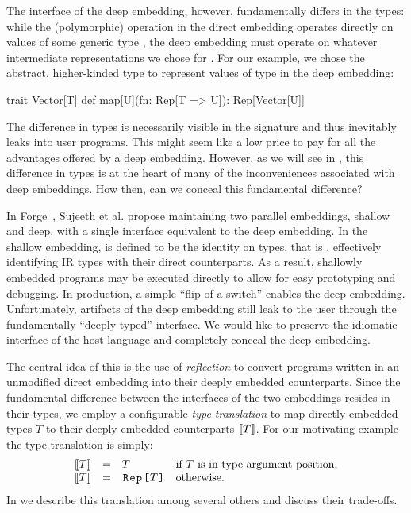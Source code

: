 The interface of the deep embedding, however,
fundamentally differs in the types: while the (polymorphic) 
operation in the direct embedding operates directly on values of some
generic type , the deep embedding must operate on whatever
intermediate representations we chose for . For our example,
we chose the abstract, higher-kinded type  to represent
values of type  in the deep embedding:\begin{lstparagraph}
trait Vector[T] {
  def map[U](fn: Rep[T => U]): Rep[Vector[U]]
}
\end{lstparagraph}

The difference in types is necessarily visible in the
signature and thus inevitably leaks into user programs. This might seem like
a low price to pay for all the advantages offered by a deep embedding.
However, as we will see in , this
difference in types is at the heart of many of the inconveniences
associated with deep embeddings. How then, can we conceal
this fundamental difference?

In Forge~\cite{forge}, Sujeeth et al. propose maintaining two parallel
embeddings, shallow and deep, with a single interface equivalent to
the deep embedding.  In the shallow embedding,  is defined
to be the identity on types, that is , effectively
identifying IR types with their direct counterparts.  As a result,
shallowly embedded programs may be executed directly to allow for easy
prototyping and debugging.  In production, a simple ``flip of a switch''
enables the deep embedding.  Unfortunately, artifacts of the deep
embedding still leak to the user through the fundamentally ``deeply
typed'' interface. We would like to preserve the idiomatic interface
of the host language and completely conceal the deep embedding.

The central idea of this \work is the use of \emph{reflection} to convert
programs written in an unmodified direct embedding into their deeply
embedded counterparts.  Since the fundamental difference between the
interfaces of the two embeddings resides in their types, we employ a
configurable \emph{type translation} to map directly embedded
types $T$ to their deeply embedded counterparts $\llbracket T \rrbracket$. For our
motivating example the type translation is simply:
\[
\begin{array}{llll}
  \ttrone{T} &=& T   & \text{if $T$ is in type argument position,}  \\
  \ttrone{T} &=& \text{\code{Rep[}}T\text{\code{]}}& \text{otherwise}.
\end{array}
\]
In  we describe this translation among several
others and discuss their trade-offs.

